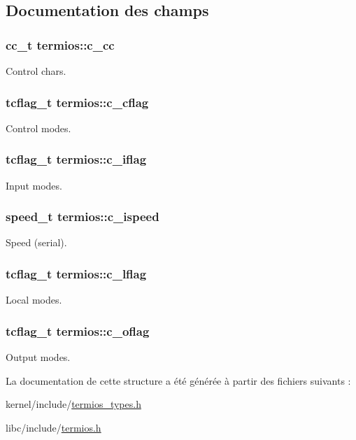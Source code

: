 \subsection{Documentation des champs}
\hypertarget{structtermios_a6058cfc222551ee750c72142299acb2e}{
\subsubsection[{c\+\_\+cc}]{\setlength{\rightskip}{0pt plus 5cm}cc\+\_\+t termios\+::c\+\_\+cc}}\label{structtermios_a6058cfc222551ee750c72142299acb2e}
Control chars. \hypertarget{structtermios_a5d42b95faa4745c3bea53652d2812162}{
\subsubsection[{c\+\_\+cflag}]{\setlength{\rightskip}{0pt plus 5cm}tcflag\+\_\+t termios\+::c\+\_\+cflag}}\label{structtermios_a5d42b95faa4745c3bea53652d2812162}
Control modes. \hypertarget{structtermios_a85b6c86d2a3db45a3829488190e357e4}{
\subsubsection[{c\+\_\+iflag}]{\setlength{\rightskip}{0pt plus 5cm}tcflag\+\_\+t termios\+::c\+\_\+iflag}}\label{structtermios_a85b6c86d2a3db45a3829488190e357e4}
Input modes. \hypertarget{structtermios_a02ae972cbc9fb2cf4a1aa6a6751a421a}{
\subsubsection[{c\+\_\+ispeed}]{\setlength{\rightskip}{0pt plus 5cm}speed\+\_\+t termios\+::c\+\_\+ispeed}}\label{structtermios_a02ae972cbc9fb2cf4a1aa6a6751a421a}
Speed (serial). \hypertarget{structtermios_a91bdd7691180800fccc4b791466ee9c3}{
\subsubsection[{c\+\_\+lflag}]{\setlength{\rightskip}{0pt plus 5cm}tcflag\+\_\+t termios\+::c\+\_\+lflag}}\label{structtermios_a91bdd7691180800fccc4b791466ee9c3}
Local modes. \hypertarget{structtermios_ad6e2cfedb81530e5a6a3a0e30b8c6362}{
\subsubsection[{c\+\_\+oflag}]{\setlength{\rightskip}{0pt plus 5cm}tcflag\+\_\+t termios\+::c\+\_\+oflag}}\label{structtermios_ad6e2cfedb81530e5a6a3a0e30b8c6362}
Output modes. 

La documentation de cette structure a été générée à partir des fichiers suivants \+:\begin{DoxyCompactItemize}
\item 
kernel/include/\hyperlink{termios__types_8h}{termios\+\_\+types.\+h}\item 
libc/include/\hyperlink{termios_8h}{termios.\+h}\end{DoxyCompactItemize}
